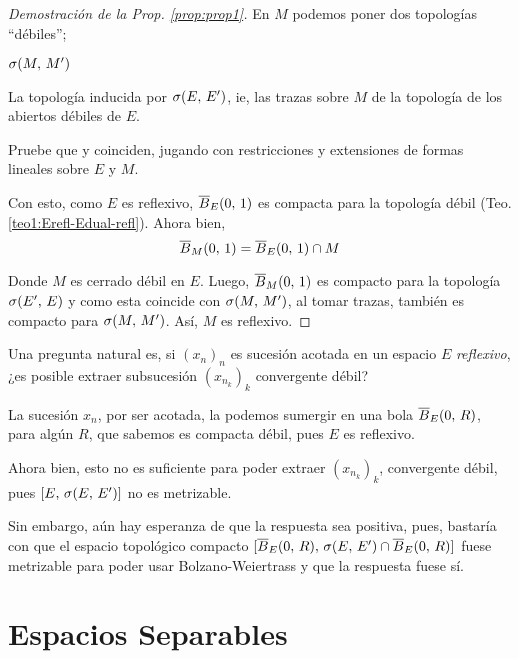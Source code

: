 \begin{proof}[Demostración de la Prop. \ref{prop:prop1}]
En $M$ podemos poner dos topologías ``débiles''; 
\begin{ienumerate}
    \item $\topdebil{M}{M'}$
    \item La topología inducida por $\topdebilE$, ie, las trazas sobre $M$ de la topología de los abiertos débiles de $E$.
\end{ienumerate}

\begin{exer}
Pruebe que \iitem[i] y \iitem[ii] coinciden, jugando con restricciones y extensiones de formas lineales sobre $E$ y  $M$.
\end{exer}

Con esto, como $E$ es reflexivo, $\bolacerradaunitariaf[E]$ es compacta para la topología débil (Teo. \ref{teo1:Erefl-Edual-refl}). Ahora bien, 
\begin{equation}
    \bolacerradaunitariaf[M] = \bolacerradaunitariaf[E] \cap M
\end{equation}

Donde $M$ es cerrado débil en $E$.
Luego, $\bolacerradaunitariaf[M]$ es compacto para la topología $\topdebilestrE$ y como esta coincide con $\topdebil{M}{M'}$, al tomar trazas, también es compacto para $\topdebil{M}{M'}$. Así, $M$ es reflexivo.
\end{proof}

Una pregunta natural es, si $(x_n)_n$ es sucesión acotada en un espacio $E$ \textit{reflexivo}, ¿es posible extraer subsucesión $(x_{n_k})_k$ convergente débil?

La sucesión $x_n$, por ser acotada, la podemos sumergir en una bola $\bolacerradaf[E]{0}{R}$, para algún $R$, que sabemos es compacta débil, pues $E$ es reflexivo.

Ahora bien, esto no es suficiente para poder extraer $(x_{n_k})_k$, convergente débil, pues $[E,\, \topdebilE]$ no es metrizable.

Sin embargo, aún hay esperanza de que la respuesta sea positiva, pues, bastaría con que el espacio topológico compacto $[\bolacerradaf[E]{0}{R},\, \topdebilE \cap \bolacerradaf[E]{0}{R}]$  fuese metrizable para poder usar Bolzano-Weiertrass y que la respuesta fuese sí.

\section{Espacios Separables}

